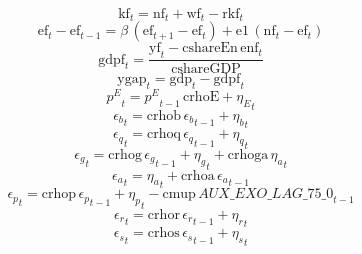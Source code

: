 \begin{dmath}
{{\mathrm{kf}}}_{t}={{\mathrm{nf}}}_{t}+{{\mathrm{wf}}}_{t}-{{\mathrm{rkf}}}_{t}
\end{dmath}
\begin{dmath}
{{\mathrm{ef}}}_{t}-{{\mathrm{ef}}}_{t-1}={{\beta}}\, \left({{\mathrm{ef}}}_{t+1}-{{\mathrm{ef}}}_{t}\right)+{{\mathrm{e1}}}\, \left({{\mathrm{nf}}}_{t}-{{\mathrm{ef}}}_{t}\right)
\end{dmath}
\begin{dmath}
{{\mathrm{gdpf}}}_{t}=\frac{{{\mathrm{yf}}}_{t}-{{\mathrm{cshareEn}}}\, {{\mathrm{enf}}}_{t}}{{{\mathrm{cshareGDP}}}}
\end{dmath}
\begin{dmath}
{{\mathrm{ygap}}}_{t}={{\mathrm{gdp}}}_{t}-{{\mathrm{gdpf}}}_{t}
\end{dmath}
\begin{dmath}
{{p^{E}}}_{t}={{p^{E}}}_{t-1}\, {{\mathrm{crhoE}}}+{{\eta_{E}}}_{t}
\end{dmath}
\begin{dmath}
{{\epsilon_{b}}}_{t}={{\mathrm{crhob}}}\, {{\epsilon_{b}}}_{t-1}+{{\eta_{b}}}_{t}
\end{dmath}
\begin{dmath}
{{\epsilon_{q}}}_{t}={{\mathrm{crhoq}}}\, {{\epsilon_{q}}}_{t-1}+{{\eta_{q}}}_{t}
\end{dmath}
\begin{dmath}
{{\epsilon_{g}}}_{t}={{\mathrm{crhog}}}\, {{\epsilon_{g}}}_{t-1}+{{\eta_{g}}}_{t}+{{\mathrm{crhoga}}}\, {{\eta_{a}}}_{t}
\end{dmath}
\begin{dmath}
{{\epsilon_{a}}}_{t}={{\eta_{a}}}_{t}+{{\mathrm{crhoa}}}\, {{\epsilon_{a}}}_{t-1}
\end{dmath}
\begin{dmath}
{{\epsilon_{p}}}_{t}={{\mathrm{crhop}}}\, {{\epsilon_{p}}}_{t-1}+{{\eta_{p}}}_{t}-{{\mathrm{cmup}}}\, {AUX\_EXO\_LAG\_75\_0}_{t-1}
\end{dmath}
\begin{dmath}
{{\epsilon_{r}}}_{t}={{\mathrm{crhor}}}\, {{\epsilon_{r}}}_{t-1}+{{\eta_{r}}}_{t}
\end{dmath}
\begin{dmath}
{{\epsilon_{s}}}_{t}={{\mathrm{crhos}}}\, {{\epsilon_{s}}}_{t-1}+{{\eta_{s}}}_{t}
\end{dmath}
